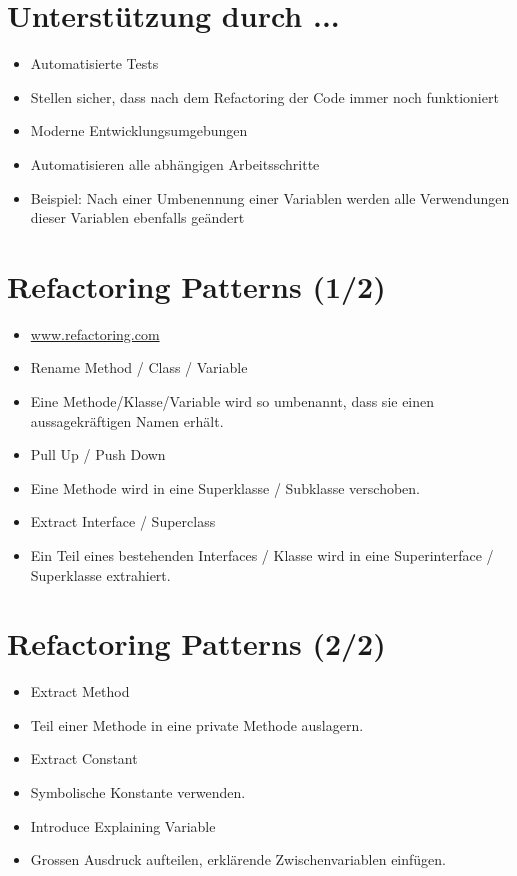 \documentclass[10pt]{article}
\begin{document}
\section*{Unterstützung durch ...}
\begin{itemize}
  \item Automatisierte Tests
  \item Stellen sicher, dass nach dem Refactoring der Code immer noch funktioniert
  \item Moderne Entwicklungsumgebungen
  \item Automatisieren alle abhängigen Arbeitsschritte
  \item Beispiel: Nach einer Umbenennung einer Variablen werden alle Verwendungen dieser Variablen ebenfalls geändert
\end{itemize}

\section*{Refactoring Patterns (1/2)}
\begin{itemize}
  \item \href{http://www.refactoring.com}{www.refactoring.com}
  \item Rename Method / Class / Variable
  \item Eine Methode/Klasse/Variable wird so umbenannt, dass sie einen aussagekräftigen Namen erhält.
  \item Pull Up / Push Down
  \item Eine Methode wird in eine Superklasse / Subklasse verschoben.
  \item Extract Interface / Superclass
  \item Ein Teil eines bestehenden Interfaces / Klasse wird in eine Superinterface / Superklasse extrahiert.
\end{itemize}

\section*{Refactoring Patterns (2/2)}
\begin{itemize}
  \item Extract Method
  \item Teil einer Methode in eine private Methode auslagern.
  \item Extract Constant
  \item Symbolische Konstante verwenden.
  \item Introduce Explaining Variable
  \item Grossen Ausdruck aufteilen, erklärende Zwischenvariablen einfügen.
\end{itemize}
\end{document}
